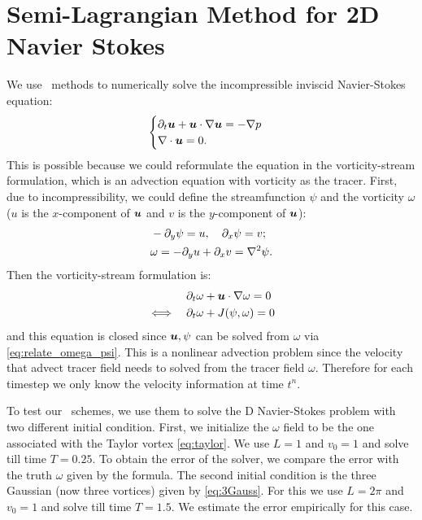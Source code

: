 \documentclass[11pt,letterpaper]{article}
\begin{document}
\begin{figure}[H]
    \caption{}\label{fig:conv_order_finu_}
\end{figure}

\section{Semi-Lagrangian Method for 2D Navier Stokes}\label{sec:nonli_adv}
We use \sml\ methods to numerically solve the incompressible inviscid Navier-Stokes equation:
\begin{align}
    \begin{cases}
    \partial_t\boldsymbol{u}+\boldsymbol{u}\cdot\nabla\boldsymbol{u}=-\nabla p\\
    \nabla\cdot\boldsymbol{u} = 0.
    \end{cases}\label{eq:2d_Nav}
\end{align}
This is possible because we could reformulate the equation in the vorticity-stream formulation, which is an advection equation with vorticity as the tracer. First, due to incompressibility, we could define the streamfunction $\psi$ and the vorticity $\omega$ ($u$ is the $x$-component of $\boldsymbol{u}$ and $v$ is the $y$-component of $\boldsymbol{u}$):
\begin{align}
    &-\partial_y \psi = u,\quad  \partial_x \psi = v;\nonumber\\
    &\omega = -\partial_y u+\partial_x v = \nabla^2 \psi.\label{eq:relate_omega_psi}
\end{align}
Then the vorticity-stream formulation is:
\begin{align}
    &\partial_t\omega+\boldsymbol{u}\cdot\nabla\omega = 0\label{eq:vort_stream}\\
    \iff\quad&\partial_t\omega+J(\psi,\omega) = 0\nonumber
\end{align}
and this equation is closed since $\boldsymbol{u},\psi$ can be solved from $\omega$ via \eqref{eq:relate_omega_psi}. This is a nonlinear advection problem since the velocity that advect tracer field needs to solved from the tracer field $\omega$. Therefore for each timestep we only know the velocity information at time $t^n$. 

To test our \sml\ schemes, we use them to solve the D Navier-Stokes problem with two different initial condition. First, we initialize the $\omega$ field to be the one associated with the Taylor vortex \eqref{eq:taylor}. We use $L = 1$ and $v_0 = 1$ and solve till time $T = 0.25$. To obtain the error of the solver, we compare the error with the truth $\omega$ given by the formula. The second initial condition is the three Gaussian (now three vortices) given by \eqref{eq:3Gauss}. For this we use $L = 2\pi$ and $v_0 = 1$ and solve till time $T = 1.5$. We estimate the error empirically for this case. 
\end{document}
